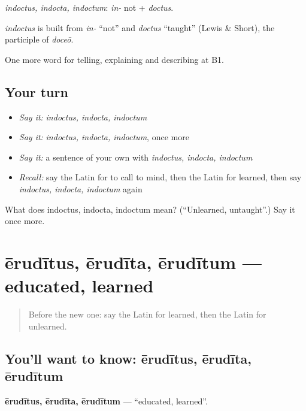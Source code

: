 \emph{indoctus, indocta, indoctum}: \emph{in-} not + \emph{doctus}.

\begin{cousinweb}
\emph{indoctus} is built from \emph{in-} \textquotedblleft{}not\textquotedblright{} and \emph{doctus} \textquotedblleft{}taught\textquotedblright{} (Lewis \& Short), the participle of \emph{doceō}.
\end{cousinweb}

\begin{grammarlens}[title={What you've built}]
One more word for telling, explaining and describing at B1.
\end{grammarlens}

\subsection*{Your turn}
\begin{itemize}
\raggedright
  \item \emph{Say it:} \emph{indoctus, indocta, indoctum}
  \item \emph{Say it:} \emph{indoctus, indocta, indoctum}, once more
  \item \emph{Say it:} a sentence of your own with \emph{indoctus, indocta, indoctum}
  \item \emph{Recall:} say the Latin for to call to mind, then the Latin for learned, then say \emph{indoctus, indocta, indoctum} again
\end{itemize}

\begin{tcolorbox}[breakable,colback=teal!4,colframe=teal!35!black,title={Before you move on}]
What does indoctus, indocta, indoctum mean? (\textquotedblleft{}Unlearned, untaught\textquotedblright{}.) Say it once more.
\end{tcolorbox}
\section[ērudītus, ērudīta, ērudītum]{ērudītus, ērudīta, ērudītum — educated, learned}

\label{lesson:LA-C403-eruditus}



\begin{quote}
Before the new one: say the Latin for learned, then the Latin for unlearned.
\end{quote}

\subsection*{You'll want to know: ērudītus, ērudīta, ērudītum}
\textbf{ērudītus, ērudīta, ērudītum} — \textquotedblleft{}educated, learned\textquotedblright{}.

